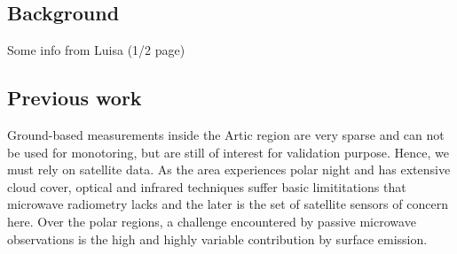 \documentclass[12pt,oneside,a4paper]{article}
\begin{document}


\subsection{Background}
%
\label{sec:background}
Some info from Luisa (1/2 page)

\subsection{Previous work}
%
\label{sec:previousworks}
%
Ground-based measurements inside the Artic region are very sparse and can not
be used for monotoring, but are still of interest for validation purpose.
Hence, we must rely on satellite data. As the area experiences polar night and
has extensive cloud cover, optical and infrared techniques suffer basic
limititations that microwave radiometry lacks and the later is the set of
satellite sensors of concern here. Over the polar regions, a challenge
encountered by passive microwave observations is the high and highly variable
contribution by surface emission.
\end{document}
